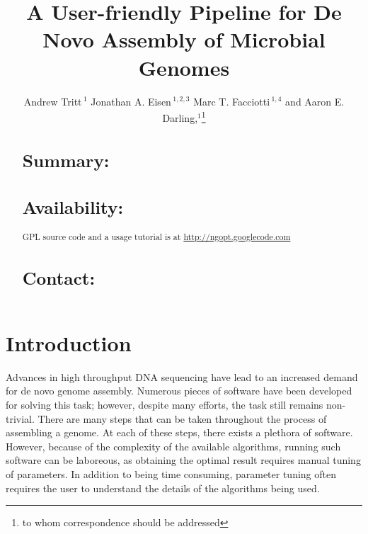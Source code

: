 \documentclass{bioinfo}
\begin{document}

\title[a5]{A User-friendly Pipeline for De Novo Assembly of Microbial Genomes}
\author[Tritt \textit{et~al}]{Andrew Tritt\,$^{1}$ Jonathan A. Eisen\,$^{1,2,3}$ Marc T. Facciotti\,$^{1,4}$ and Aaron E. Darling,$^{1}$\footnote{to whom correspondence should be addressed}}
\address{$^{1}$Genome Center, $^{2}$ Dept. of Evolution and Ecology, $^{3}$ Medical Microbiology and Immunology, 
$^{4}$ Biomedical Engineering, University of California-Davis, Davis, CA 95616.}



\maketitle

\begin{abstract}

\section{Summary:}
\section{Availability:}
GPL source code and a usage tutorial is at \href{http://ngopt.googlecode.com}{http://ngopt.googlecode.com}

\section{Contact:} \href{rabid apes}{}
\end{abstract}

\section{Introduction}
Advances in high throughput DNA sequencing have lead to an increased demand for de novo 
genome assembly. Numerous pieces of software have been developed for solving this task; 
however, despite many efforts, the task still remains non-trivial. There are many 
steps that can be taken throughout the process of assembling a genome. At each of these steps,
there exists a plethora of software. However, because of the complexity of the available algorithms,
running such software can be laboreous, as obtaining the optimal result requires manual tuning of parameters.
In addition to being time consuming, parameter tuning often requires the user to understand the details
of the algorithms being used. 
\end{document}
